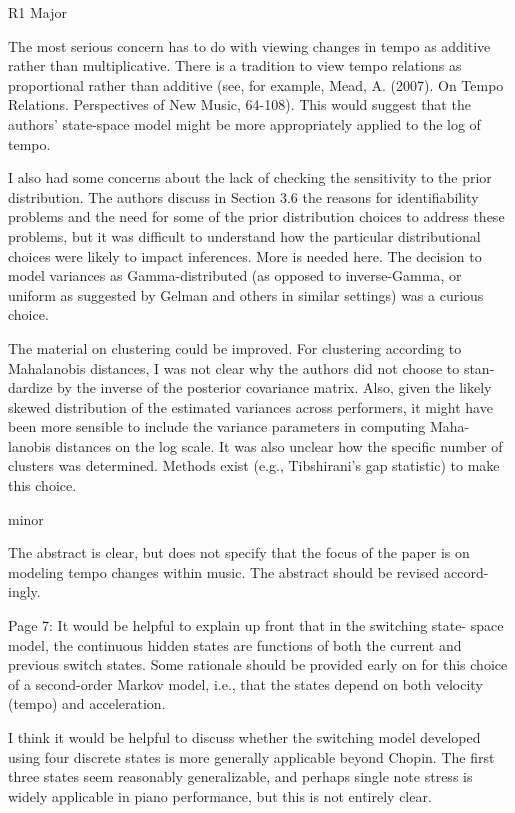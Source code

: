 

R1 Major

The most serious concern has to do with viewing changes in tempo as additive rather than multiplicative. There is a tradition to view tempo relations as proportional rather than additive (see, for example, Mead, A. (2007). On Tempo Relations. Perspectives of New Music, 64-108). This would suggest that the authors’ state-space model might be more appropriately applied to the log of tempo.

I also had some concerns about the lack of checking the sensitivity to the prior distribution. The authors discuss in Section 3.6 the reasons for identifiability problems and the need for some of the prior distribution choices to address these problems, but it was difficult to understand how the particular distributional choices were likely to impact inferences. More is needed here. The decision to model variances as Gamma-distributed (as opposed to inverse-Gamma, or uniform as suggested by Gelman and others in similar settings) was a curious choice.

The material on clustering could be improved. For clustering according to Mahalanobis distances, I was not clear why the authors did not choose to stan- dardize by the inverse of the posterior covariance matrix. Also, given the likely skewed distribution of the estimated variances across performers, it might have been more sensible to include the variance parameters in computing Maha- lanobis distances on the log scale. It was also unclear how the specific number of clusters was determined. Methods exist (e.g., Tibshirani’s gap statistic) to make this choice.

minor

The abstract is clear, but does not specify that the focus of the paper is on modeling tempo changes within music. The abstract should be revised accord- ingly.

Page 7: It would be helpful to explain up front that in the switching state- space model, the continuous hidden states are functions of both the current and previous switch states. Some rationale should be provided early on for this choice of a second-order Markov model, i.e., that the states depend on both velocity (tempo) and acceleration.

I think it would be helpful to discuss whether the switching model developed using four discrete states is more generally applicable beyond Chopin. The first three states seem reasonably generalizable, and perhaps single note stress is widely applicable in piano performance, but this is not entirely clear.

